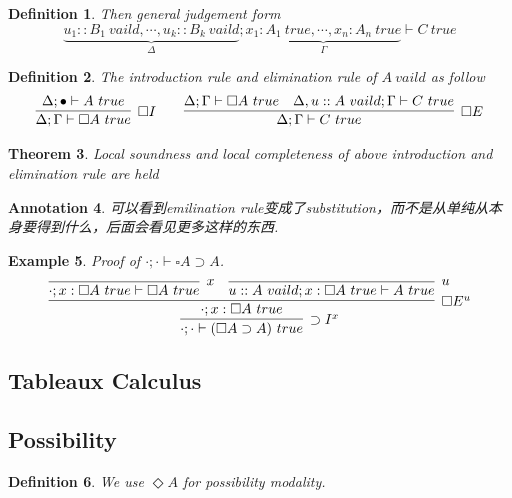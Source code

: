 \documentclass{article}
\theoremstyle{plain}
\newtheorem{theorem}{Theorem}
\newtheorem{example}[theorem]{Example}
\newtheorem{definition}[theorem]{Definition}
\newtheorem{annotation}[theorem]{Annotation}
\theoremstyle{nonumberplain}
\begin{document}
\begin{definition}
\rm Then general judgement form
$$
\underbrace{u_1::B_1~vaild,\cdots,u_k::B_k~vaild}_{\Delta}; \underbrace{x_1:A_1~true,\cdots,x_n:A_n~true}_{\Gamma} \vdash C~true
$$
\end{definition}

\begin{definition}
\rm The introduction rule and elimination rule of $A~vaild$ as follow
$$
\begin{aligned}
\infer[\square I]{\Delta; \Gamma \vdash \square A~true}{\Delta; \bullet \vdash A~true} &&&& \infer[\square E]{\Delta;\Gamma \vdash C~true}{\Delta;\Gamma \vdash \square A~true & \Delta, u::A~vaild; \Gamma \vdash C~true}
\end{aligned}
$$
\end{definition}

\begin{theorem}
\rm Local soundness and local completeness of above introduction and elimination rule are held 
\end{theorem}

\begin{annotation}
\rm 可以看到emilination rule变成了substitution，而不是从单纯从本身要得到什么，后面会看见更多这样的东西. 
\end{annotation}


\begin{example}
\rm Proof of $\cdot;\cdot\vdash \square A \supset A$.
$$
\infer[\supset I^x]{\cdot;\cdot\vdash (\square A \supset A)~true}{\infer[\square E^u]{\cdot;x:\square A~true}{\infer[x]{\cdot;x:\square A~true \vdash \square A~true}{} & \infer[u]{u::A~vaild; x:\square A~true \vdash A~true}{}  }}
$$
\end{example}

\newpage

\subsection{Tableaux Calculus}


\newpage
\subsection{Possibility}

\begin{definition}
\rm We use $\Diamond A$ for possibility modality.
\end{definition}
\end{document}
